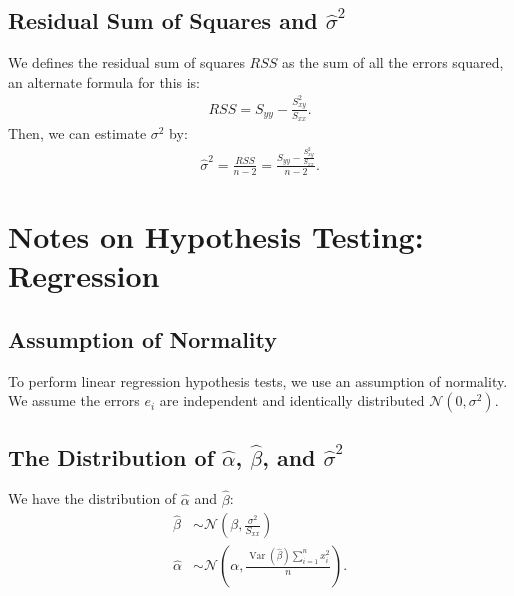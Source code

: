 \documentclass[a4paper, 12pt, twoside]{article}
\DeclareMathOperator{\Var}{Var}
\begin{document}
\subsection{Residual Sum of Squares and $\hat\sigma^2$}

We defines the residual sum of squares $RSS$ as the sum of
all the errors squared, an alternate formula for this is:
\begin{align*}
    RSS = S_{yy} - \frac{S_{xy}^2}{S_{xx}}.
\end{align*}
Then, we can estimate $\sigma^2$ by:
\begin{align*}
    \hat\sigma^2 = \frac{RSS}{n - 2}
    = \frac{S_{yy} - \frac{S_{xy}^2}{S_{xx}}}{n - 2}.
\end{align*}

\section{Notes on Hypothesis Testing: Regression}

\subsection{Assumption of Normality}

To perform linear regression hypothesis tests, we use an assumption
of normality. We assume the errors $e_i$ are independent and
identically distributed $\mathcal{N}(0, \sigma^2)$.

\subsection{The Distribution of $\hat\alpha$,
    $\hat\beta$, and $\hat\sigma^2$}

We have the distribution of $\hat\alpha$ and
$\hat\beta$:
\begin{align*}
    \hat\beta  & \sim \mathcal{N}\left(\beta,
    \frac{\sigma^2}{S_{xx}}\right)             \\
    \hat\alpha & \sim \mathcal{N}\left(\alpha,
    \frac{\Var(\hat\beta) \sum_{i = 1}^n x_i^2}{n}\right).
\end{align*}

\newpage
\end{document}
